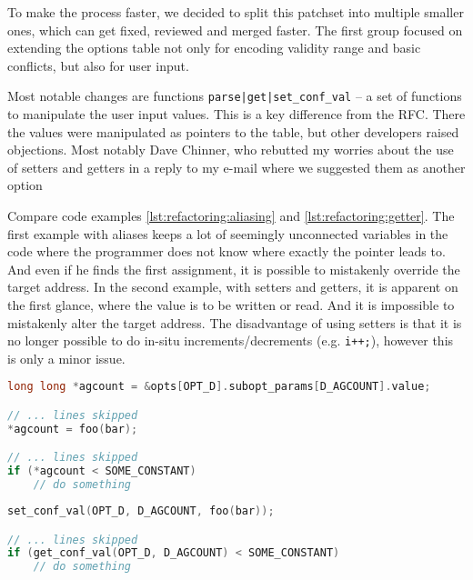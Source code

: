 To make the process faster, we decided to split this patchset into multiple
smaller ones, which can get fixed, reviewed and merged faster. The first
group focused on extending the options table not only for encoding validity
range and basic conflicts, but also for user input.

Most notable changes are functions {\tt parse|get|set\_conf\_val}
-- a set of functions to manipulate the user input values. This is a key
difference from the RFC. There the values were manipulated as pointers to the
table, but other developers raised objections. Most notably Dave Chinner, who
rebutted my worries about the use of setters and getters in a reply to my
e-mail where we suggested them as another option~\cite{unifyTypes1, unifyTypes2}

Compare code examples \ref{lst:refactoring:aliasing} and
\ref{lst:refactoring:getter}.  The first example with aliases keeps a lot of
seemingly unconnected variables in the code where the programmer does not know
where exactly the pointer leads to. And even if he finds the first assignment,
it is possible to mistakenly override the target address. In the second
example, with setters and getters, it is apparent on the first glance, where
the value is to be written or read. And it is impossible to mistakenly alter
the target address. The disadvantage of using setters is that it is no longer possible to do in-situ increments/decrements (e.g. {\tt i++;}), however this is only a minor issue.

\begin{lstlisting}[frame=none, basicstyle=\footnotesize\ttfamily,
language=C, numbers=none, numberstyle=\tiny\color{black},
label={lst:refactoring:aliasing},
caption={Pointer aliases in RFC of the second set.}]
long long *agcount = &opts[OPT_D].subopt_params[D_AGCOUNT].value;

// ... lines skipped
*agcount = foo(bar);

// ... lines skipped
if (*agcount < SOME_CONSTANT)
	// do something
\end{lstlisting}

\begin{lstlisting}[frame=none, basicstyle=\footnotesize\ttfamily,
language=C, numbers=none, numberstyle=\tiny\color{black},
label={lst:refactoring:getter},
caption={Setters and getters in later version of the second set.}]
set_conf_val(OPT_D, D_AGCOUNT, foo(bar));

// ... lines skipped
if (get_conf_val(OPT_D, D_AGCOUNT) < SOME_CONSTANT)
	// do something
\end{lstlisting}


